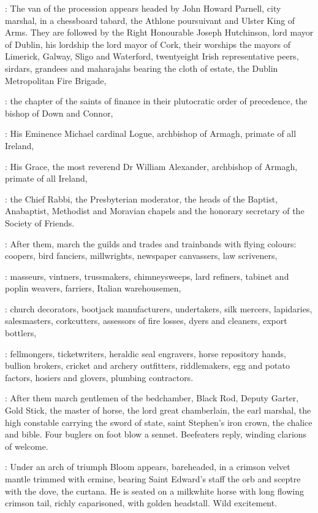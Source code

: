 :
The van of the procession appears headed by John Howard Parnell, city marshal,
in a chessboard tabard, the Athlone poursuivant and Ulster King of Arms.
They are followed by the Right Honourable Joseph Hutchinson,
lord mayor of Dublin, his lordship the lord mayor of Cork,
their worships the mayors of Limerick, Galway, Sligo and Waterford,
twentyeight Irish representative peers, sirdars, grandees and maharajahs
bearing the cloth of estate, the Dublin Metropolitan Fire Brigade,

:
the chapter of the saints of finance in their plutocratic order of precedence,
the bishop of Down and Connor,

:
His Eminence Michael cardinal Logue,
archbishop of Armagh, primate of all Ireland,

:
His Grace, the most reverend Dr William Alexander,
archbishop of Armagh, primate of all Ireland,

:
the Chief Rabbi, the Presbyterian moderator,
the heads of the Baptist, Anabaptist, Methodist and Moravian chapels
and the honorary secretary of the Society of Friends.

:
After them, march the guilds and trades and trainbands with flying colours:
coopers, bird fanciers, millwrights, newspaper canvassers, law scriveners,

:
masseurs, vintners, trussmakers, chimneysweeps, lard refiners,
tabinet and poplin weavers, farriers, Italian warehousemen,

:
church decorators, bootjack manufacturers, undertakers,
silk mercers, lapidaries, salesmasters, corkcutters,
assessors of fire losses, dyers and cleaners, export bottlers,

:
fellmongers, ticketwriters, heraldic seal engravers,
horse repository hands, bullion brokers, cricket and archery outfitters,
riddlemakers, egg and potato factors, hosiers and glovers, plumbing contractors.

:
After them march gentlemen of the bedchamber,
Black Rod, Deputy Garter, Gold Stick, the master of horse,
the lord great chamberlain, the earl marshal,
the high constable carrying the sword of state,
saint Stephen's iron crown, the chalice and bible.
Four buglers on foot blow a sennet.
Beefeaters reply, winding clarions of welcome.

:
Under an arch of triumph Bloom appears, bareheaded,
in a crimson velvet mantle trimmed with ermine,
bearing Saint Edward's staff the orb and sceptre with the dove, the curtana.
He is seated on a milkwhite horse with long flowing crimson tail,
richly caparisoned, with golden headstall.
Wild excitement.

